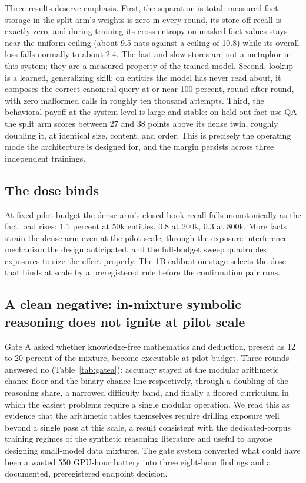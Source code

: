 \documentclass[11pt]{article}
\begin{document}
Three results deserve emphasis. First, the separation is total: measured
fact storage in the split arm's weights is zero in every round, its
store-off recall is exactly zero, and during training its cross-entropy
on masked fact values stays near the uniform ceiling (about 9.5 nats
against a ceiling of 10.8) while its overall loss falls normally to about
2.4. The fast and slow stores are not a metaphor in this system; they are
a measured property of the trained model. Second, lookup is a learned,
generalizing skill: on entities the model has never read about, it
composes the correct canonical query at or near 100 percent, round after
round, with zero malformed calls in roughly ten thousand attempts.
Third, the behavioral payoff at the system level is large and stable: on
held-out fact-use QA the split arm scores between 27 and 38 points above
its dense twin, roughly doubling it, at identical size, content, and
order. This is precisely the operating mode the architecture is designed
for, and the margin persists across three independent trainings.

\subsection{The dose binds}

At fixed pilot budget the dense arm's closed-book recall falls
monotonically as the fact load rises: 1.1 percent at 50k entities, 0.8 at
200k, 0.3 at 800k. More facts strain the dense arm even at the pilot
scale, through the exposure-interference mechanism the design
anticipated, and the full-budget sweep quadruples exposures to size the
effect properly. The 1B calibration stage selects the dose that binds at
scale by a preregistered rule before the confirmation pair runs.

\subsection{A clean negative: in-mixture symbolic reasoning does not
ignite at pilot scale}

Gate A asked whether knowledge-free mathematics and deduction, present as
12 to 20 percent of the mixture, become executable at pilot budget. Three
rounds answered no (Table~\ref{tab:gatea}): accuracy stayed at the modular
arithmetic chance floor and the binary chance line respectively, through a
doubling of the reasoning share, a narrowed difficulty band, and finally a
floored curriculum in which the easiest problems require a single modular
operation. We read this as evidence that the arithmetic tables themselves
require drilling exposure well beyond a single pass at this scale, a
result consistent with the dedicated-corpus training regimes of the
synthetic reasoning literature and useful to anyone designing small-model
data mixtures. The gate system converted what could have been a wasted
550 GPU-hour battery into three eight-hour findings and a documented,
preregistered endpoint decision.
\end{document}
